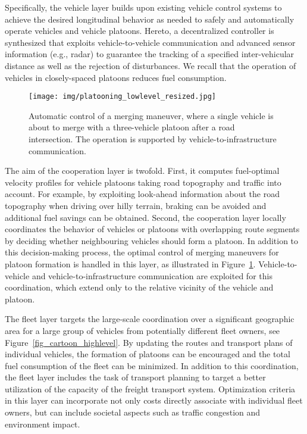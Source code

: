 \documentclass[journal]{IEEEtran}
\begin{document}
Specifically, the vehicle layer builds upon existing vehicle control systems to achieve the desired longitudinal behavior as needed to safely and automatically operate vehicles and vehicle platoons. Hereto, a decentralized controller is synthesized that exploits vehicle-to-vehicle communication and advanced sensor
information (e.g., radar) to guarantee the tracking of a specified inter-vehicular distance as well as the rejection of disturbances. We recall that the operation of vehicles in closely-spaced platoons reduces fuel consumption.

\begin{figure}
\begin{center}
  \texttt{[image: img/platooning\_lowlevel\_resized.jpg]}
  \vskip-1mm\caption{Automatic control of a merging maneuver, where a single vehicle is about to merge with a three-vehicle platoon after a road intersection. The operation is supported by vehicle-to-infrastructure communication.}
  \label{fig_cartoon_lowlevel}
\end{center}
\end{figure}

The aim of the cooperation layer is twofold. First, it computes fuel-optimal velocity profiles for vehicle platoons taking road topography and traffic into account. For example, by exploiting look-ahead information about the road topography when driving over hilly terrain, braking can be avoided and additional fuel savings can be obtained. Second, the cooperation layer locally coordinates the behavior of vehicles or platoons with overlapping route segments by deciding whether neighbouring vehicles should form a platoon. In addition to this decision-making process, the optimal control of merging maneuvers for platoon formation is handled in this layer, as illustrated in Figure~\ref{fig_cartoon_lowlevel}. Vehicle-to-vehicle and vehicle-to-infrastructure communication are exploited for this coordination, which extend only to the relative vicinity of the vehicle and platoon.

The fleet layer targets the large-scale coordination over a significant geographic area for a large group of vehicles from potentially different fleet owners, see Figure~\ref{fig_cartoon_highlevel}. By updating the routes and transport plans of individual vehicles, the formation of platoons can be encouraged and the total fuel consumption of the fleet can be minimized. In addition to this coordination, the fleet layer includes the task of transport planning to target a better utilization of the capacity of the freight transport system. Optimization criteria in this layer can incorporate not only costs directly associate with individual fleet owners, but can include societal aspects such as traffic congestion and environment impact.
\end{document}
